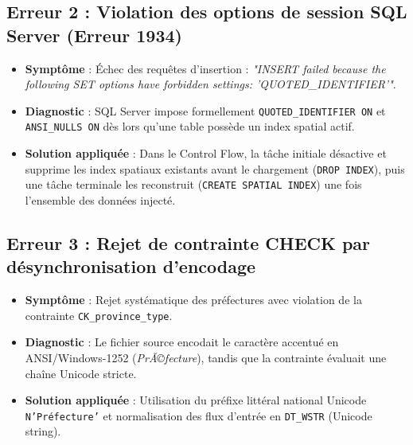 \documentclass[12pt,a4paper]{article}
\begin{document}
\subsection{Erreur 2 : Violation des options de session SQL Server (Erreur 1934)}
\begin{itemize}[leftmargin=1.2cm]
    \item \textbf{Symptôme} : Échec des requêtes d'insertion : \textit{"INSERT failed because the following SET options have forbidden settings: 'QUOTED\_IDENTIFIER'"}.
    \item \textbf{Diagnostic} : SQL Server impose formellement \texttt{QUOTED\_IDENTIFIER ON} et \texttt{ANSI\_NULLS ON} dès lors qu'une table possède un index spatial actif.
    \item \textbf{Solution appliquée} : Dans le Control Flow, la tâche initiale désactive et supprime les index spatiaux existants avant le chargement (\texttt{DROP INDEX}), puis une tâche terminale les reconstruit (\texttt{CREATE SPATIAL INDEX}) une fois l'ensemble des données injecté.
\end{itemize}

\subsection{Erreur 3 : Rejet de contrainte CHECK par désynchronisation d'encodage}
\begin{itemize}[leftmargin=1.2cm]
    \item \textbf{Symptôme} : Rejet systématique des préfectures avec violation de la contrainte \texttt{CK\_province\_type}.
    \item \textbf{Diagnostic} : Le fichier source encodait le caractère accentué en ANSI/Windows-1252 (\textit{PrÃ©fecture}), tandis que la contrainte évaluait une chaîne Unicode stricte.
    \item \textbf{Solution appliquée} : Utilisation du préfixe littéral national Unicode \texttt{N'Préfecture'} et normalisation des flux d'entrée en \texttt{DT\_WSTR} (Unicode string).
\end{itemize}
\end{document}
